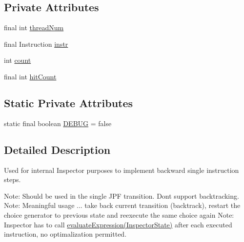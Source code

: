 \subsection*{Private Attributes}
\begin{DoxyCompactItemize}
\item 
final int \hyperlink{classgov_1_1nasa_1_1jpf_1_1inspector_1_1server_1_1expression_1_1expressions_1_1_expression_breakpoint_instruction_ae0489eeae571443863290d903f344df4}{thread\+Num}
\item 
final Instruction \hyperlink{classgov_1_1nasa_1_1jpf_1_1inspector_1_1server_1_1expression_1_1expressions_1_1_expression_breakpoint_instruction_a6b2dcad08b9b60a759ade34be81d85ad}{instr}
\item 
int \hyperlink{classgov_1_1nasa_1_1jpf_1_1inspector_1_1server_1_1expression_1_1expressions_1_1_expression_breakpoint_instruction_a5f34ea83fbef51ac62d0853ab034f473}{count}
\item 
final int \hyperlink{classgov_1_1nasa_1_1jpf_1_1inspector_1_1server_1_1expression_1_1expressions_1_1_expression_breakpoint_instruction_af26750b70ecf7859781d731fae9b2405}{hit\+Count}
\end{DoxyCompactItemize}
\subsection*{Static Private Attributes}
\begin{DoxyCompactItemize}
\item 
static final boolean \hyperlink{classgov_1_1nasa_1_1jpf_1_1inspector_1_1server_1_1expression_1_1expressions_1_1_expression_breakpoint_instruction_ac93551d7a34f93820e1759d2f0761c84}{D\+E\+B\+UG} = false
\end{DoxyCompactItemize}


\subsection{Detailed Description}
Used for internal Inspector purposes to implement backward single instruction steps. 

Note\+: Should be used in the single J\+PF transition. Don\textquotesingle{}t support backtracking. Note\+: Meaningful usage ... take back current transition (backtrack), restart the choice generator to previous state and reexecute the same choice again Note\+: Inspector has to call \hyperlink{classgov_1_1nasa_1_1jpf_1_1inspector_1_1server_1_1expression_1_1expressions_1_1_expression_breakpoint_instruction_a9fce761f3dafa426c52a8440a4aff369}{evaluate\+Expression(\+Inspector\+State)} after each executed instruction, no optimalization permitted. 

